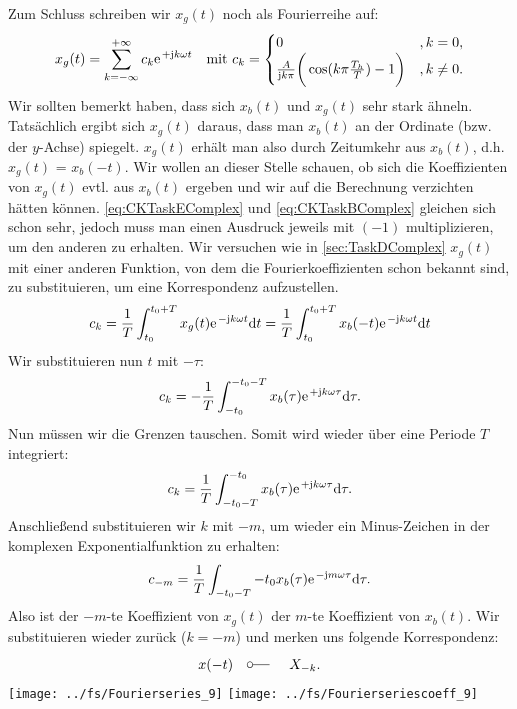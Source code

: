 \documentclass[11pt,a4paper,DIV=12]{scrartcl}
\newcommand{\diff}{\mathrm{d}}
\begin{document}
Zum Schluss schreiben wir $x_{g}(t)$ noch als Fourierreihe auf:
\begin{align}
	x_{g}(t)=\sum_{k=-\infty}^{+\infty}c_k\e^{+\im k \omega t}\quad\text{mit }c_k=\begin{cases}
		0&,k=0,\\
		\frac{A}{\im k \pi}\bigg (\cos(k\pi\frac{T_h}{T})-1\bigg )&,k\neq 0.
	\end{cases}
\end{align}
Wir sollten bemerkt haben, dass sich $x_{b}(t)$ und $x_{g}(t)$ sehr stark ähneln. Tatsächlich ergibt sich $x_{g}(t)$ daraus, dass man $x_{b}(t)$ an der Ordinate (bzw. der $y$-Achse) spiegelt. $x_{g}(t)$ erhält man also durch Zeitumkehr aus $x_{b}(t)$, d.h. $x_{g}(t)$ = $x_{b}(-t)$. Wir wollen an dieser Stelle schauen, ob sich die Koeffizienten von $x_{g}(t)$ evtl. aus $x_{b}(t)$ ergeben und wir auf die Berechnung verzichten hätten können. \eqref{eq:CKTaskEComplex} und \eqref{eq:CKTaskBComplex} gleichen sich schon sehr, jedoch muss man einen Ausdruck jeweils mit $(-1)$ multiplizieren, um den anderen zu erhalten. Wir versuchen wie in \ref{sec:TaskDComplex} $x_{g}(t)$ mit einer anderen Funktion, von dem die Fourierkoeffizienten schon bekannt sind, zu substituieren, um eine Korrespondenz aufzustellen.
\begin{align}
	c_k=\frac{1}{T}\int_{t_0}^{t_0+T}x_{g}(t)\e^{-\im k \omega t}\diff t = \frac{1}{T}\int_{t_0}^{t_0+T}x_{b}(-t)\e^{-\im k \omega t}\diff t
\end{align}
Wir substituieren nun $t$ mit $-\tau$:
\begin{align}
	c_k=-\frac{1}{T}\int_{-t_0}^{-t_0-T}x_{b}(\tau)\e^{+\im k \omega \tau}\diff \tau.
\end{align}
Nun müssen wir die Grenzen tauschen. Somit wird wieder über eine Periode $T$ integriert:
\begin{align}
	c_k=\frac{1}{T}\int_{-t_0-T}^{-t_0}x_{b}(\tau)\e^{+\im k \omega \tau}\diff \tau.
\end{align}
Anschließend substituieren wir $k$ mit $-m$, um wieder ein Minus-Zeichen in der komplexen Exponentialfunktion zu erhalten:
\begin{align}
	c_{-m}=\frac{1}{T}\int_{-t_0-T}{-t_0}x_{b}(\tau)\e^{-\im m \omega \tau}\diff \tau.
\end{align}
Also ist der $-m$-te Koeffizient von $x_{g}(t)$ der $m$-te Koeffizient von $x_{b}(t)$. Wir substituieren wieder zurück ($k=-m$) und merken uns folgende Korrespondenz:
\begin{align}
	x(-t)\quad\fourier\quad X_{-k}.
\end{align}
\newpage
\texttt{[image: ../fs/Fourierseries\_9]}
\texttt{[image: ../fs/Fourierseriescoeff\_9]}
\newpage
\end{document}
